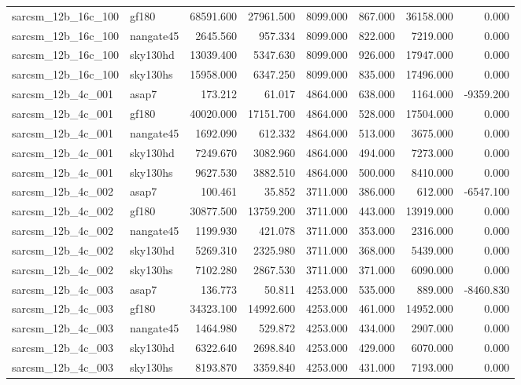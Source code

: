 \begin{tabular}{llrrrrrr}
sarcsm\_12b\_16c\_100 & gf180 & 68591.600 & 27961.500 & 8099.000 & 867.000 & 36158.000 & 0.000 \\
sarcsm\_12b\_16c\_100 & nangate45 & 2645.560 & 957.334 & 8099.000 & 822.000 & 7219.000 & 0.000 \\
sarcsm\_12b\_16c\_100 & sky130hd & 13039.400 & 5347.630 & 8099.000 & 926.000 & 17947.000 & 0.000 \\
sarcsm\_12b\_16c\_100 & sky130hs & 15958.000 & 6347.250 & 8099.000 & 835.000 & 17496.000 & 0.000 \\
sarcsm\_12b\_4c\_001 & asap7 & 173.212 & 61.017 & 4864.000 & 638.000 & 1164.000 & -9359.200 \\
sarcsm\_12b\_4c\_001 & gf180 & 40020.000 & 17151.700 & 4864.000 & 528.000 & 17504.000 & 0.000 \\
sarcsm\_12b\_4c\_001 & nangate45 & 1692.090 & 612.332 & 4864.000 & 513.000 & 3675.000 & 0.000 \\
sarcsm\_12b\_4c\_001 & sky130hd & 7249.670 & 3082.960 & 4864.000 & 494.000 & 7273.000 & 0.000 \\
sarcsm\_12b\_4c\_001 & sky130hs & 9627.530 & 3882.510 & 4864.000 & 500.000 & 8410.000 & 0.000 \\
sarcsm\_12b\_4c\_002 & asap7 & 100.461 & 35.852 & 3711.000 & 386.000 & 612.000 & -6547.100 \\
sarcsm\_12b\_4c\_002 & gf180 & 30877.500 & 13759.200 & 3711.000 & 443.000 & 13919.000 & 0.000 \\
sarcsm\_12b\_4c\_002 & nangate45 & 1199.930 & 421.078 & 3711.000 & 353.000 & 2316.000 & 0.000 \\
sarcsm\_12b\_4c\_002 & sky130hd & 5269.310 & 2325.980 & 3711.000 & 368.000 & 5439.000 & 0.000 \\
sarcsm\_12b\_4c\_002 & sky130hs & 7102.280 & 2867.530 & 3711.000 & 371.000 & 6090.000 & 0.000 \\
sarcsm\_12b\_4c\_003 & asap7 & 136.773 & 50.811 & 4253.000 & 535.000 & 889.000 & -8460.830 \\
sarcsm\_12b\_4c\_003 & gf180 & 34323.100 & 14992.600 & 4253.000 & 461.000 & 14952.000 & 0.000 \\
sarcsm\_12b\_4c\_003 & nangate45 & 1464.980 & 529.872 & 4253.000 & 434.000 & 2907.000 & 0.000 \\
sarcsm\_12b\_4c\_003 & sky130hd & 6322.640 & 2698.840 & 4253.000 & 429.000 & 6070.000 & 0.000 \\
sarcsm\_12b\_4c\_003 & sky130hs & 8193.870 & 3359.840 & 4253.000 & 431.000 & 7193.000 & 0.000 \\

\end{tabular}
